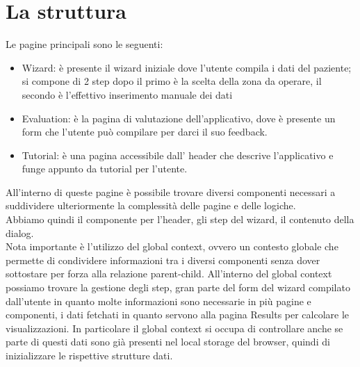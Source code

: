 \section{La struttura}
Le pagine principali sono le seguenti:\\ 
\begin{itemize}
\item Wizard: è presente il wizard iniziale dove l'utente compila i dati del paziente; si compone di 2 step dopo il primo è la scelta della zona da operare, il secondo è l'effettivo inserimento manuale dei dati
\item Evaluation: è la pagina di valutazione dell'applicativo, dove è presente un form che l'utente può compilare per darci il suo feedback. 
\item Tutorial: è una pagina accessibile dall' header che descrive l'applicativo e funge appunto da tutorial per l'utente. 
\end{itemize}
All'interno di queste pagine è possibile trovare diversi componenti necessari a suddividere ulteriormente la complessità delle pagine e delle logiche.\\ 
Abbiamo quindi il componente per l'header, gli step del wizard, il contenuto della dialog.\\

Nota importante è l'utilizzo del global context, ovvero un contesto globale che permette di condividere informazioni tra i diversi componenti senza dover sottostare per forza alla relazione parent-child. All'interno del global context possiamo trovare la gestione degli step, gran parte del form del wizard compilato dall'utente in quanto molte informazioni sono necessarie in più pagine e componenti, i dati fetchati in quanto servono alla pagina Results per calcolare le visualizzazioni. In particolare il global context si occupa di controllare anche se parte di questi dati sono già presenti nel local storage del browser, quindi di inizializzare le rispettive strutture dati. 



